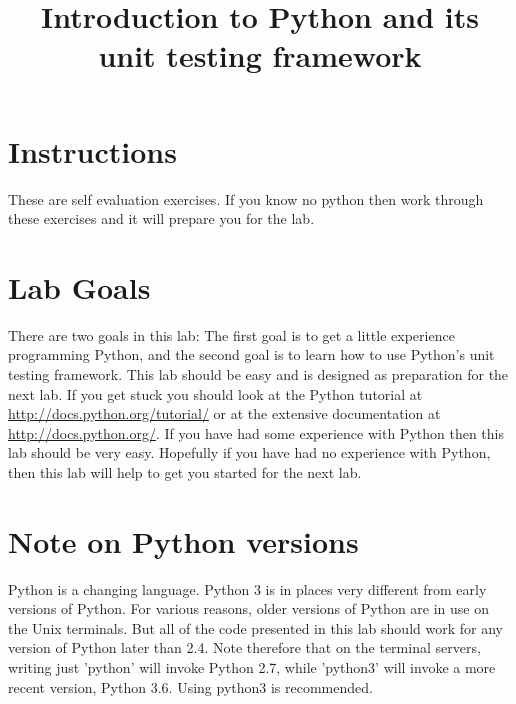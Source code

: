 \documentclass{paper}
\title{Introduction to Python and its unit testing framework}
\begin{document}
\maketitle
\section*{Instructions}
These are self evaluation exercises. If you know no python then work through
these exercises and it will prepare you for the lab.
\section*{Lab Goals}
There are two goals in this lab: The first goal is to get a little experience
programming Python, and the second goal is to learn how to use Python's unit
testing framework. This lab should be easy and is designed as preparation for
the next lab. If you get stuck you should look at the Python tutorial at
\url{http://docs.python.org/tutorial/} or at the extensive documentation at
\url{http://docs.python.org/}. If you have had some experience with Python
then this lab should be very easy. Hopefully if you have had no experience
with Python, then this lab will help to get you started for the next lab.
\section*{Note on Python versions}
Python is a changing language. Python 3 is in places very different
from early versions of Python. For various reasons, older versions of
Python are in use on the Unix terminals. But all of the code presented in
this lab should work for any version of Python later than 2.4.
Note therefore that on the terminal servers, writing just 'python' will invoke Python 2.7,
while 'python3' will invoke a more recent version, Python 3.6. Using
python3 is recommended.
\end{document}
